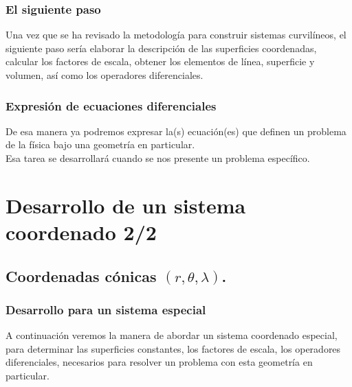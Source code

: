 \documentclass[12pt]{beamer}
\begin{document}
\begin{frame}
\frametitle{El siguiente paso}
Una vez que se ha revisado la metodología para construir sistemas curvilíneos, el siguiente paso sería elaborar la descripción de las superficies coordenadas, calcular los factores de escala, obtener los elementos de línea, superficie y volumen, así como los operadores diferenciales.
\end{frame}
\begin{frame}
\frametitle{Expresión de ecuaciones diferenciales}
De esa manera ya podremos expresar la(s) ecuación(es) que definen un problema de la física bajo una geometría en particular.
\\
\bigskip
\pause
Esa tarea se desarrollará cuando se nos presente un problema específico.
\end{frame}

\section{Desarrollo de un sistema coordenado 2/2}
\subsection{Coordenadas cónicas \texorpdfstring{$(r, \theta, \lambda)$}{(r, t, l)}.}

\begin{frame}
\frametitle{Desarrollo para un sistema especial}
A continuación veremos la manera de abordar un sistema coordenado especial, para determinar las superficies constantes, los factores de escala, los operadores diferenciales, necesarios para resolver un problema con esta geometría en particular.
\end{frame}
\end{document}
